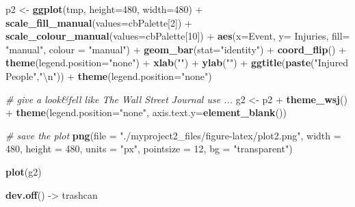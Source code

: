 \documentclass[12pt,spanish, american,b4paper, onecolumn, lmargin=1cm, rmargin=1cm, tmargin=1cm, bmargin=2cm,]{article}
\newenvironment{Shaded}{}{}
\newcommand{\KeywordTok}[1]{\textbf{{#1}}}
\newcommand{\DataTypeTok}[1]{\textcolor[rgb]{0.50,0.00,0.00}{{#1}}}
\newcommand{\DecValTok}[1]{\textcolor[rgb]{0.00,0.00,1.00}{{#1}}}
\newcommand{\CharTok}[1]{\textcolor[rgb]{1.00,0.00,1.00}{{#1}}}
\newcommand{\StringTok}[1]{\textcolor[rgb]{0.87,0.00,0.00}{{#1}}}
\newcommand{\CommentTok}[1]{\textcolor[rgb]{0.50,0.50,0.50}{\textit{{#1}}}}
\newcommand{\NormalTok}[1]{{#1}}
\begin{document}
\begin{Shaded}
\begin{Highlighting}[]
\NormalTok{p2 <-}\StringTok{ }\KeywordTok{ggplot}\NormalTok{(tmp, }\DataTypeTok{height=}\DecValTok{480}\NormalTok{, }\DataTypeTok{width=}\DecValTok{480}\NormalTok{) +}\StringTok{ }
\StringTok{  }\KeywordTok{scale_fill_manual}\NormalTok{(}\DataTypeTok{values=}\NormalTok{cbPalette[}\DecValTok{2}\NormalTok{]) +}
\StringTok{  }\KeywordTok{scale_colour_manual}\NormalTok{(}\DataTypeTok{values=}\NormalTok{cbPalette[}\DecValTok{10}\NormalTok{]) +}
\StringTok{  }\KeywordTok{aes}\NormalTok{(}\DataTypeTok{x=}\NormalTok{Event, }\DataTypeTok{y=} \NormalTok{Injuries, }\DataTypeTok{fill=} \StringTok{"manual"}\NormalTok{, }\DataTypeTok{colour =} \StringTok{"manual"}\NormalTok{) +}
\StringTok{  }\KeywordTok{geom_bar}\NormalTok{(}\DataTypeTok{stat=}\StringTok{"identity"}\NormalTok{) +}
\StringTok{  }\KeywordTok{coord_flip}\NormalTok{() +}\StringTok{ }
\StringTok{  }\KeywordTok{theme}\NormalTok{(}\DataTypeTok{legend.position=}\StringTok{"none"}\NormalTok{) +}\StringTok{ }
\StringTok{  }\KeywordTok{xlab}\NormalTok{(}\StringTok{""}\NormalTok{) +}\StringTok{ }
\StringTok{  }\KeywordTok{ylab}\NormalTok{(}\StringTok{""}\NormalTok{) +}\StringTok{ }
\StringTok{  }\KeywordTok{ggtitle}\NormalTok{(}\KeywordTok{paste}\NormalTok{(}\StringTok{"Injured People"}\NormalTok{,}\StringTok{"}\CharTok{\textbackslash{}n}\StringTok{"}\NormalTok{)) +}
\StringTok{  }\KeywordTok{theme}\NormalTok{(}\DataTypeTok{legend.position=}\StringTok{"none"}\NormalTok{)}

\CommentTok{# give a look&fell like The Wall Street Journal use ... }
\NormalTok{g2 <-}\StringTok{ }\NormalTok{p2 +}\StringTok{ }
\StringTok{  }\KeywordTok{theme_wsj}\NormalTok{() +}
\StringTok{  }\KeywordTok{theme}\NormalTok{(}\DataTypeTok{legend.position=}\StringTok{"none"}\NormalTok{, }\DataTypeTok{axis.text.y=}\KeywordTok{element_blank}\NormalTok{())}

\CommentTok{# save the plot }
\KeywordTok{png}\NormalTok{(}\DataTypeTok{file =} \StringTok{"./myproject2_files/figure-latex/plot2.png"}\NormalTok{, }
    \DataTypeTok{width =} \DecValTok{480}\NormalTok{, }
    \DataTypeTok{height =} \DecValTok{480}\NormalTok{, }
    \DataTypeTok{units =} \StringTok{"px"}\NormalTok{, }
    \DataTypeTok{pointsize =} \DecValTok{12}\NormalTok{,}
    \DataTypeTok{bg =} \StringTok{"transparent"}\NormalTok{)}

\KeywordTok{plot}\NormalTok{(g2)}

\KeywordTok{dev.off}\NormalTok{() ->}\StringTok{ }\NormalTok{trashcan}
\end{Highlighting}
\end{Shaded}
\end{document}
